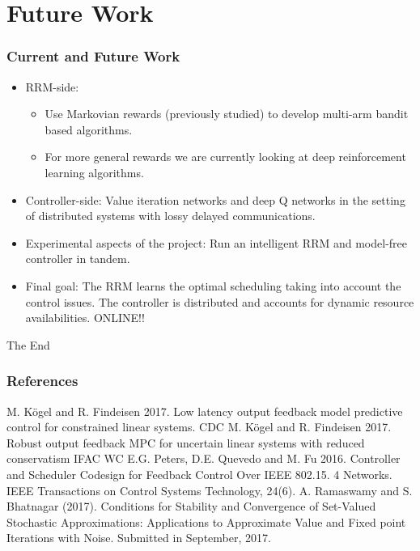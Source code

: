 \documentclass{beamer}
\begin{document}
\section{Future Work}
\begin{frame}
 \frametitle{Current and Future Work}
 \begin{itemize}
  \item RRM-side: 
  \begin{itemize}
   \item Use Markovian rewards (previously studied) to develop multi-arm bandit based
	algorithms.
  \item For more general rewards we are currently looking at deep 
  reinforcement learning algorithms.
  \end{itemize}
  \item Controller-side: Value iteration networks and deep Q networks in the setting of distributed 
  systems with lossy delayed communications.
  \item Experimental aspects of the project: Run an intelligent RRM and model-free controller in tandem.
  \item Final goal: The RRM learns the optimal scheduling taking into account the control issues. 
  The controller is distributed and
  accounts for dynamic resource availabilities. {\color{purple} ONLINE!!}
  \end{itemize}
\end{frame}
\begin{frame}
\Huge{\centerline{The End}}
\end{frame}
\begin{frame}
\frametitle{References}
\footnotesize{
\begin{thebibliography}{99} %
 M. K\"{o}gel and R. Findeisen 2017. Low latency output feedback model predictive control for
constrained linear systems. CDC
 M. K\"{o}gel and R. Findeisen 2017. Robust output feedback MPC for uncertain linear systems with
reduced conservatism  IFAC WC
 E.G. Peters, D.E. Quevedo and M. Fu 2016. Controller and Scheduler Codesign for 
 Feedback Control Over IEEE 802.15. 4 Networks. IEEE Transactions on Control Systems Technology, 24(6).
  A. Ramaswamy and S. Bhatnagar (2017).
 Conditions for Stability and Convergence of
Set-Valued Stochastic Approximations: Applications to Approximate Value and Fixed
point Iterations with Noise. Submitted in September, 2017.
 \end{thebibliography}
}
\end{frame}
\end{document}
